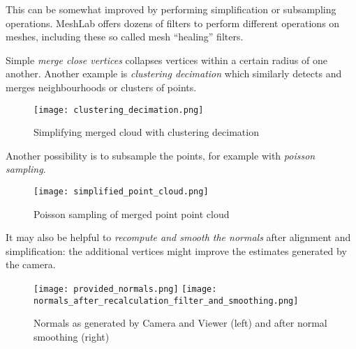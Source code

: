 This can be somewhat improved by performing simplification or subsampling operations.
MeshLab offers dozens of filters to perform different operations on meshes, including
these so called mesh ``healing'' filters.

Simple \textit{merge close vertices} collapses vertices within a certain radius
of one another. Another example is \textit{clustering decimation} which similarly detects
and merges neighbourhoods or clusters of points.

\begin{figure}[h]
\centering
\texttt{[image: clustering\_decimation.png]}
\caption{Simplifying merged cloud with clustering decimation}
\end{figure}

Another possibility is to subsample the points, for example with \textit{poisson sampling}.

\begin{figure}[h]
\centering
\texttt{[image: simplified\_point\_cloud.png]}
\caption{Poisson sampling of merged point point cloud}
\end{figure}

It may also be helpful to \textit{recompute and smooth the normals} after alignment and simplification:
the additional vertices might improve the estimates generated by the camera.

\begin{figure}[H]
\centering
\texttt{[image: provided\_normals.png]}
\texttt{[image: normals\_after\_recalculation\_filter\_and\_smoothing.png]}
\caption{Normals as generated by Camera and Viewer (left) and after normal smoothing (right)}
\end{figure}
